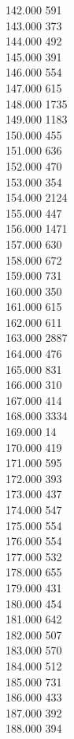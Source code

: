 { 142.000	591 \\
 143.000	373 \\
 144.000	492 \\
 145.000	391 \\
 146.000	554 \\
 147.000	615 \\
 148.000	1735 \\
 149.000	1183 \\
 150.000	455 \\
 151.000	636 \\
 152.000	470 \\
 153.000	354 \\
 154.000	2124 \\
 155.000	447 \\
 156.000	1471 \\
 157.000	630 \\
 158.000	672 \\
 159.000	731 \\
 160.000	350 \\
 161.000	615 \\
 162.000	611 \\
 163.000	2887 \\
 164.000	476 \\
 165.000	831 \\
 166.000	310 \\
 167.000	414 \\
 168.000	3334 \\
 169.000	14 \\
 170.000	419 \\
 171.000	595 \\
 172.000	393 \\
 173.000	437 \\
 174.000	547 \\
 175.000	554 \\
 176.000	554 \\
 177.000	532 \\
 178.000	655 \\
 179.000	431 \\
 180.000	454 \\
 181.000	642 \\
 182.000	507 \\
 183.000	570 \\
 184.000	512 \\
 185.000	731 \\
 186.000	433 \\
 187.000	392 \\
 188.000	394 \\
}
